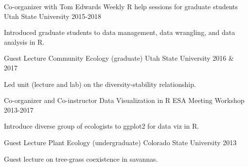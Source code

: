 

\begin{cventries}

  \cventry
    {Co-organizer with Tom Edwards} %
    {Weekly R help sessions for graduate students} %
    {Utah State University} %
    {2015-2018} %
    {
      \begin{cvitems} %
        \item {Introduced graduate students to data management, data wrangling, and data analysis in R.}
      \end{cvitems}
    }

  \cventry
    {Guest Lecture} %
    {Community Ecology (graduate)} %
    {Utah State University} %
    {2016 \& 2017} %
    {
      \begin{cvitems} %
        \item {Led unit (lecture and lab) on the diversity-stability relationship.}
      \end{cvitems}
    }

  \cventry
    {Co-organizer and Co-instructor} %
    {Data Visualization in R} %
    {ESA Meeting Workshop} %
    {2013-2017} %
    {
      \begin{cvitems} %
        \item {Introduce diverse group of ecologists to ggplot2 for data viz in R.}
      \end{cvitems}
    }

  \cventry
    {Guest Lecture} %
    {Plant Ecology (undergraduate)} %
    {Colorado State University} %
    {2013} %
    {
      \begin{cvitems} %
        \item {Guest lecture on tree-grass coexistence in savannas.}
      \end{cvitems}
    }


\end{cventries}
